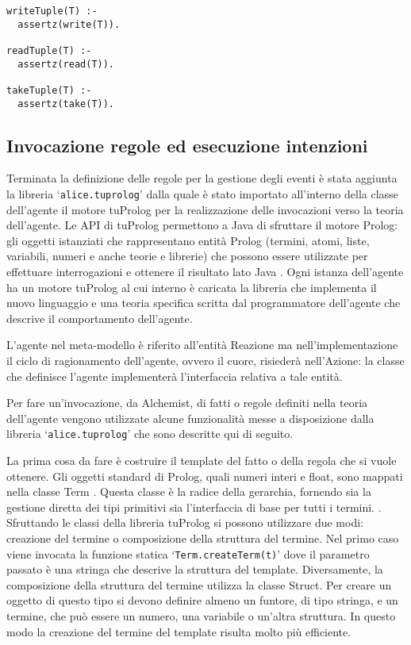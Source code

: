 \switchToProlog{}
\begin{lstlisting}[float,firstnumber=1,label={lst:ImplementazioneRegoleSpatialTuples},caption={Implementazione regole estensione Spatial Tuples}]
writeTuple(T) :-
  assertz(write(T)).

readTuple(T) :-
  assertz(read(T)).

takeTuple(T) :-
  assertz(take(T)).
\end{lstlisting}

\subsection{Invocazione regole ed esecuzione intenzioni}\label{sctn:InvocazioneEsecuzioneIntenzioni}
Terminata la definizione delle regole per la gestione degli eventi è stata aggiunta la libreria `\texttt{alice.tuprolog}' dalla quale è stato importato all'interno della classe dell'agente il motore tuProlog per la realizzazione delle invocazioni verso la teoria dell'agente.
Le API di tuProlog permettono a Java di sfruttare il motore Prolog: gli oggetti istanziati che rappresentano entità Prolog (termini, atomi, liste, variabili, numeri e anche teorie e librerie) che possono essere utilizzate per effettuare interrogazioni e ottenere il risultato lato Java \cite{2p-alpnews2013}.
Ogni istanza dell'agente ha un motore tuProlog al cui interno è caricata la libreria che implementa il nuovo linguaggio e una teoria specifica scritta dal programmatore dell'agente che descrive il comportamento dell'agente.

L'agente nel meta-modello è riferito all'entità Reazione ma nell'implementazione il ciclo di ragionamento dell'agente, ovvero il cuore, risiederà nell'Azione: la classe che definisce l'agente implementerà l'interfaccia relativa a tale entità.

Per fare un'invocazione, da Alchemist, di fatti o regole definiti nella teoria dell'agente vengono utilizzate alcune funzionalità messe a disposizione dalla libreria `\texttt{alice.tuprolog}' che sono descritte qui di seguito.

La prima cosa da fare è costruire il template del fatto o della regola che si vuole ottenere.
Gli oggetti standard di Prolog, quali numeri interi e float, sono mappati nella classe Term \cite{tuPrologLight-weight}. Questa classe è la radice della gerarchia, fornendo sia la gestione diretta dei tipi primitivi sia l'interfaccia di base per tutti i termini. \cite{tuPrologLight-weight}.
Sfruttando le classi della libreria tuProlog si possono utilizzare due modi: creazione del termine o composizione della struttura del termine. Nel primo caso viene invocata la funzione statica `\texttt{Term.createTerm(t)}' dove il parametro passato è una stringa che descrive la struttura del template. Diversamente, la composizione della struttura del termine utilizza la classe Struct. Per creare un oggetto di questo tipo si devono definire almeno un funtore, di tipo stringa, e un termine, che può essere un numero, una variabile o un'altra struttura. In questo modo la creazione del termine del template risulta molto più efficiente.

